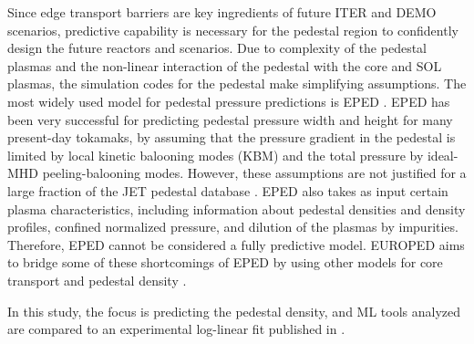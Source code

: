 \documentclass[a4paper, twoside, final, 12pt]{article}
\begin{document}
Since edge transport barriers are key ingredients of future ITER and DEMO scenarios, predictive capability is necessary for the pedestal region to confidently design the future reactors and scenarios.
Due to complexity of the pedestal plasmas and the non-linear interaction of the pedestal with the core and SOL plasmas, the simulation codes for the pedestal make simplifying assumptions. The most widely used model for pedestal pressure predictions is EPED \cite{EPED_ELM, Snyder_2011}. 
EPED has been very successful for predicting pedestal pressure width and height for many present-day tokamaks, by assuming that the pressure gradient in the pedestal is limited by local kinetic balooning modes (KBM) and the total pressure by ideal-MHD peeling-balooning modes. However, these assumptions are not justified for a large fraction of the JET pedestal database \cite{Frassinetti_2020}. EPED also takes as input certain plasma characteristics, including information about pedestal densities and density profiles, confined normalized pressure, and dilution of the plasmas by impurities. Therefore, EPED cannot be considered a fully predictive model. EUROPED aims to bridge some of these shortcomings of EPED by using other models for core transport and pedestal density \cite{Saarelma_2017, pedestal_prediction}. 

In this study, the focus is predicting the pedestal density, and ML tools analyzed are compared to an experimental log-linear fit published in \cite{Frassinetti_2020}.
\end{document}
